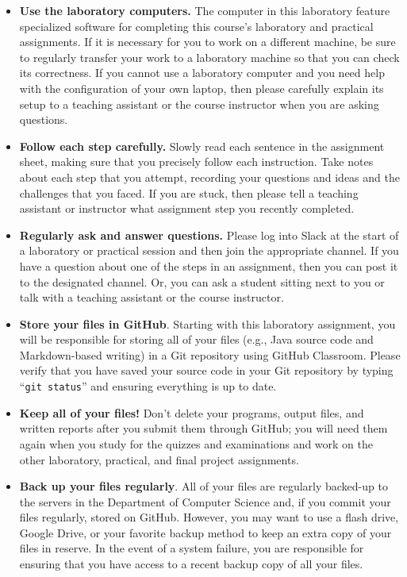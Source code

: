 \documentclass[11pt]{article}
\begin{document}
\begin{itemize}
  \setlength{\itemsep}{0pt}

\item {\bf Use the laboratory computers.} The computer in this laboratory feature specialized software for completing
  this course's laboratory and practical assignments. If it is necessary for you to work on a different machine, be sure
  to regularly transfer your work to a laboratory machine so that you can check its correctness. If you cannot use a
  laboratory computer and you need help with the configuration of your own laptop, then please carefully explain its
  setup to a teaching assistant or the course instructor when you are asking questions.

\item {\bf Follow each step carefully.} Slowly read each sentence in the assignment sheet, making sure that you
  precisely follow each instruction. Take notes about each step that you attempt, recording your questions and ideas and
  the challenges that you faced. If you are stuck, then please tell a teaching assistant or instructor what assignment
  step you recently completed.

\item {\bf Regularly ask and answer questions.} Please log into Slack at the start of a laboratory or practical session
  and then join the appropriate channel. If you have a question about one of the steps in an assignment, then you can
  post it to the designated channel. Or, you can ask a student sitting next to you or talk with a teaching assistant or
  the course instructor.

\item {\bf Store your files in GitHub}. Starting with this laboratory assignment, you will be responsible for storing all
  of your files (e.g., Java source code and Markdown-based writing) in a Git repository using GitHub Classroom. Please
  verify that you have saved your source code in your Git repository by typing ``{\tt git status}'' and ensuring
  everything is up to date.

\item {\bf Keep all of your files!} Don't delete your programs, output files, and written reports after you submit them
  through GitHub; you will need them again when you study for the quizzes and examinations and work on the other
  laboratory, practical, and final project assignments.

\item {\bf Back up your files regularly}. All of your files are regularly backed-up to the servers in the Department of
  Computer Science and, if you commit your files regularly, stored on GitHub. However, you may want to use a flash
  drive, Google Drive, or your favorite backup method to keep an extra copy of your files in reserve. In the event of a
  system failure, you are responsible for ensuring that you have access to a recent backup copy of all your files.


\end{itemize}
\end{document}
